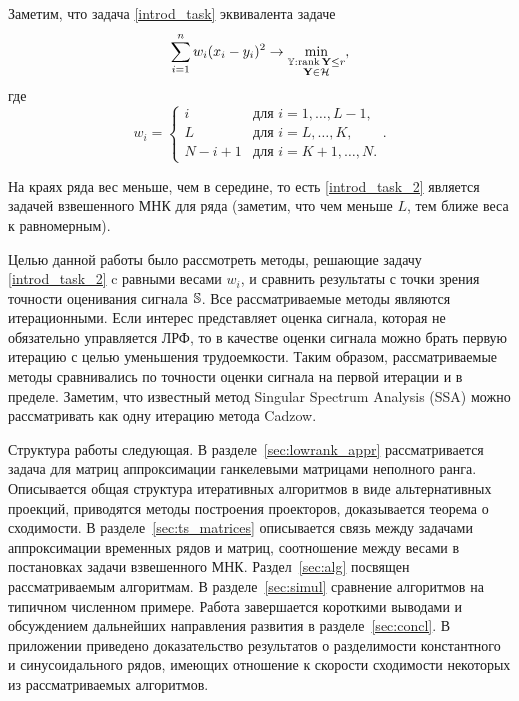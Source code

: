 \documentclass[12pt,a4paper,fleqn,leqno]{article}
\def\rank{\mathop{\mathrm{rank}}}
\begin{document}
Заметим, что задача \eqref{introd_task} эквивалента задаче
\begin{equation}\label{introd_task_2}
\sum_{i = 1}^n w_i(x_i - y_i)^2 \to \min_{\substack{\tsY: \rank \bfY \le r \\ \bfY \in \calH}},
\end{equation}
где
\begin{equation}
\label{eq:w}
w_i = \begin{cases}
i & \text{для $i = 1, \ldots, L-1,$}\\
L & \text{для $i = L, \ldots, K,$}\\
N - i + 1 & \text{для $i = K + 1, \ldots, N.$}
\end{cases}.
\end{equation}

На краях ряда вес меньше, чем в середине, то есть \eqref{introd_task_2} является задачей взвешенного МНК для ряда (заметим, что чем меньше $L$, тем ближе веса к равномерным).

Целью данной работы было рассмотреть методы, решающие задачу \eqref{introd_task_2} c равными весами $w_i$, и сравнить результаты с точки зрения точности оценивания сигнала $\mathbb{S}$. Все рассматриваемые методы являются итерационными. Если интерес представляет оценка сигнала, которая не обязательно управляется ЛРФ, то в качестве оценки сигнала можно брать первую итерацию с целью уменьшения трудоемкости. Таким образом, рассматриваемые методы сравнивались по точности оценки сигнала на первой итерации и в пределе. Заметим, что известный метод Singular Spectrum Analysis (SSA) \cite{Broomhead.King1986, Vautard.etal1992, Elsner.Tsonis1996, Golyandina.etal2001, Ghil.etal2002, Golyandina.Zhigljavsky2012} можно
рассматривать как одну итерацию метода Cadzow.

Структура работы следующая.  В разделе~\ref{sec:lowrank_appr} рассматривается задача для матриц аппроксимации ганкелевыми матрицами неполного ранга.
Описывается общая структура итеративных алгоритмов в виде альтернативных проекций, приводятся методы построения проекторов, доказывается теорема о сходимости.
В разделе~\ref{sec:ts_matrices} описывается связь между задачами аппроксимации временных рядов и матриц, соотношение между весами в постановках задачи
взвешенного МНК. Раздел~\ref{sec:alg} посвящен рассматриваемым алгоритмам. В разделе~\ref{sec:simul} сравнение алгоритмов на типичном численном примере.
Работа завершается короткими выводами и обсуждением дальнейших направления развития в разделе~\ref{sec:concl}. В приложении приведено доказательство результатов
о разделимости константного и синусоидального рядов, имеющих отношение к скорости сходимости некоторых из рассматриваемых алгоритмов.
\end{document}
